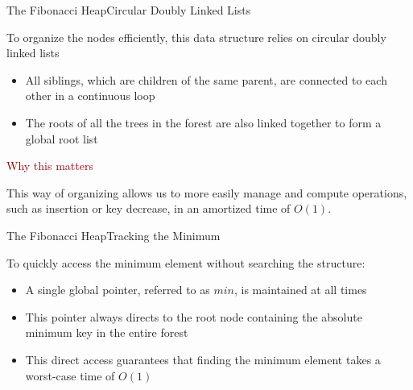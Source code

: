 \documentclass{beamer}
\begin{document}
\begin{frame}[c]{The Fibonacci Heap}{Circular Doubly Linked Lists}

  \vspace{0.4cm}
  
  To organize the nodes efficiently, this data structure relies on circular doubly linked lists
  
  \vspace{0.1cm}
  
  \begin{itemize}
    \item All siblings, which are children of the same parent, are connected to each other in a continuous loop
    \item The roots of all the trees in the forest are also linked together to form a global root list
  \end{itemize}
  
  \vspace{0.4cm}
  
  {\large \textcolor{darkred}{Why this matters}}
  
  \vspace{0.1cm}
  
  This way of organizing allows us to more easily manage and compute operations, such as insertion or key decrease, in an amortized time of $O(1)$.
  
  \vspace{0.2cm}
  
  \begin{center}
    
  \end{center}

\end{frame}


\begin{frame}[c]{The Fibonacci Heap}{Tracking the Minimum}

  \vspace{0.6cm}
  
  To quickly access the minimum element without searching the structure:
  
  \vspace{0.1cm}
  
  \begin{itemize}
    \item A single global pointer, referred to as $min$, is maintained at all times
    \item This pointer always directs to the root node containing the absolute minimum key in the entire forest
    \item This direct access guarantees that finding the minimum element takes a worst-case time of $O(1)$
  \end{itemize}
  
  \vspace{0.4cm}
  
  \begin{center}
    
  \end{center}

\end{frame}
\end{document}
